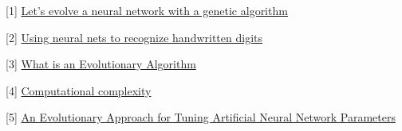 \documentclass[11pt]{article}
\begin{document}
{[}1{]}
\href{https://blog.coast.ai/lets-evolve-a-neural-network-with-a-genetic-algorithm-code-included-8809bece164}{Let's
evolve a neural network with a genetic algorithm}

{[}2{]} \href{http://neuralnetworksanddeeplearning.com/chap1.html}{Using
neural nets to recognize handwritten digits}

{[}3{]}
\href{https://www.cs.vu.nl/~gusz/ecbook/Eiben-Smith-Intro2EC-Ch2.pdf}{What
is an Evolutionary Algorithm}

{[}4{]}
\href{https://en.wikipedia.org/wiki/Computational_complexity}{Computational
complexity}

{[}5{]}
\href{https://pdfs.semanticscholar.org/7d7b/84986459ccc1de349342d44fde999c3de8e9.pdf}{An
Evolutionary Approach for Tuning Artificial Neural Network Parameters}


    
    
    
    
\end{document}
